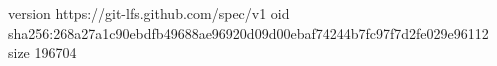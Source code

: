 version https://git-lfs.github.com/spec/v1
oid sha256:268a27a1c90ebdfb49688ae96920d09d00ebaf74244b7fc97f7d2fe029e96112
size 196704

